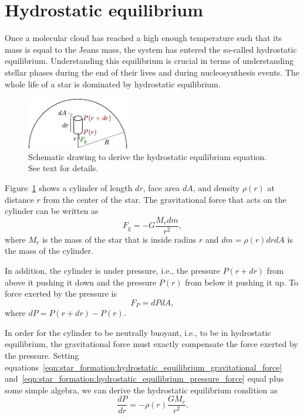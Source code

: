 \section{Hydrostatic equilibrium} \label{sec:star_formation:hydrostatic_equilibrium}

Once a molecular cloud has reached a high enough temperature such that its mass is equal to the Jeans mass, the system has entered the so-called hydrostatic equilibrium. Understanding this equilibrium is crucial in terms of understanding stellar phases during the end of their lives and during nucleosynthesis events. The whole life of a star is dominated by hydrostatic equilibrium. 

\begin{figure}[tb]
    \centering
    \includegraphics[width=0.4\textwidth]{graphics/star_formation/hydrostatic_equilibrium}
    \caption{Schematic drawing to derive the hydrostatic equilibrium equation. See text for details.}
    \label{fig:star_formation:hydrostatic_equilibrium_schematic}
\end{figure}
Figure~\ref{fig:star_formation:hydrostatic_equilibrium_schematic} shows a cylinder of length $dr$, face area $dA$, and density $\rho(r)$ at distance $r$ from the center of the star. The gravitational force that acts on the cylinder can be written as
\begin{equation}
    F_\mathrm{g} = -G\frac{M_r dm}{r^2},
    \label{eqn:star_formation:hydrostatic_equilibrium_gravitational_force}
\end{equation}
where $M_r$ is the mass of the star that is inside radius $r$ and $dm = \rho(r) dr dA$ is the mass of the cylinder. 


In addition, the cylinder is under pressure, i.e., the pressure $P(r+dr)$ from above it pushing it down and the pressure $P(r)$ from below it pushing it up. To force exerted by the pressure is 
\begin{equation}
    F_P = dPdA,
    \label{eqn:star_formation:hydrostatic_equilibrium_pressure_force}
\end{equation}
where $dP = P(r+dr) - P(r)$.

In order for the cylinder to be neutrally buoyant, i.e., to be in hydrostatic equilibrium, the gravitational force must exactly compensate the force exerted by the pressure. Setting equations~\eqref{eqn:star_formation:hydrostatic_equilibrium_gravitational_force} and~\eqref{eqn:star_formation:hydrostatic_equilibrium_pressure_force} equal plus some simple algebra, we can derive the hydrostatic equilibrium condition as
\begin{equation}
    \frac{dP}{dr} = -\rho(r) \frac{GM_r}{r^2}.
    \label{eqn:star_formation:hydrostatic_equilibrium}
\end{equation}


